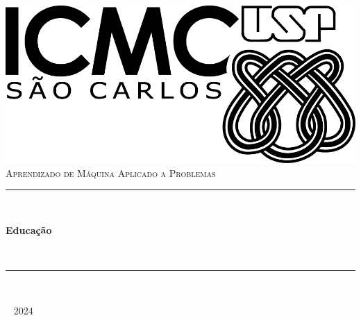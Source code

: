 \begin{titlepage}


\newcommand{\HRule}{\rule{\linewidth}{0.5mm}} %


\center
\includegraphics[width=10
cm]{Graphics/LogoICMC.png}\\[1cm]


\textsc{\large Aprendizado de Máquina Aplicado a Problemas}\\[1.5cm]

\makeatletter
\rule{\linewidth}{0.2 mm} \\[0.4 cm]
{\huge\bfseries Educação \par} \
\rule{\linewidth}{0.2 mm} \\[1.0 cm]

\begin{minipage}{0.4\textwidth}
\begin{flushleft} 
\end{flushleft}
\end{minipage}
~
\vspace{1cm}
\vspace{7cm}
\makeatother
{\large 2024}\\[2cm] %
\vfill %





\end{titlepage}


